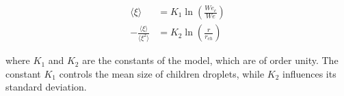 \begin{subequations}
\label{eq:gorokhovski_epsilon_parameters_definition}
\begin{align}
\langle \xi \rangle &=  K_1 \ln \left(  \frac{We_c}{We}  \right) \\
- \frac{\langle \xi \rangle}{\langle \xi^2 \rangle} &=  K_2 \ln \left( \frac{r}{r_{ch}} \right)
\end{align}
\end{subequations}

where $K_1$ and $K_2$ are the constants of the model, which are of order unity. The constant $K_1$ controls the mean size of children droplets, while $K_2$ influences its standard deviation.





%
%
%
%
%
%
%
%

